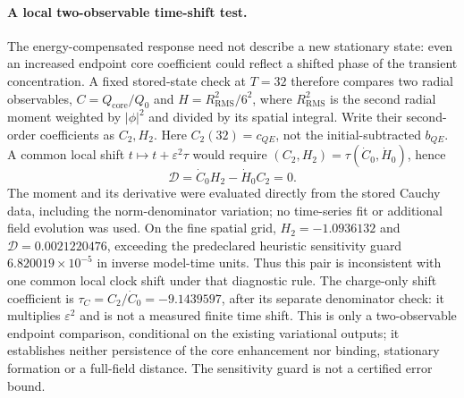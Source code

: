 \paragraph{A local two-observable time-shift test.}
The energy-compensated response need not describe a new stationary state:
even an increased endpoint core coefficient could reflect a shifted phase
of the transient concentration. A fixed stored-state check at $T=32$
therefore compares two radial observables,
$C=Q_{\mathrm{core}}/Q_0$ and $H=R_{\mathrm{RMS}}^2/6^2$, where $R_{\mathrm{RMS}}^2$
is the second radial moment weighted by $|\phi|^2$ and divided by its
spatial integral. Write their second-order coefficients as $C_2,H_2$.
Here $C_2(32)=c_{QE}$, not the initial-subtracted $b_{QE}$.
A common local shift $t\mapsto t+\varepsilon^2\tau$ would require
$(C_2,H_2)=\tau(\dot C_0,\dot H_0)$, hence
\[
 \mathcal D=\dot C_0 H_2-\dot H_0 C_2=0.
\]
The moment and its derivative were evaluated directly from the stored
Cauchy data, including the norm-denominator variation; no time-series fit
or additional field evolution was used. On the fine spatial grid,
$H_2=-1.0936132$ and $\mathcal D=0.0021220476$, exceeding the predeclared
heuristic sensitivity guard $6.820019\times10^{-5}$ in inverse model-time
units. Thus this pair is inconsistent with one common local clock shift
under that diagnostic rule. The charge-only shift coefficient is
$\tau_C=C_2/\dot C_0=-9.1439597$, after its separate denominator check:
it multiplies $\varepsilon^2$ and is not a measured finite time shift.
This is only a two-observable endpoint comparison, conditional on the
existing variational outputs; it establishes neither persistence of the
core enhancement nor binding, stationary formation or a full-field distance.
The sensitivity guard is not a certified error bound.
